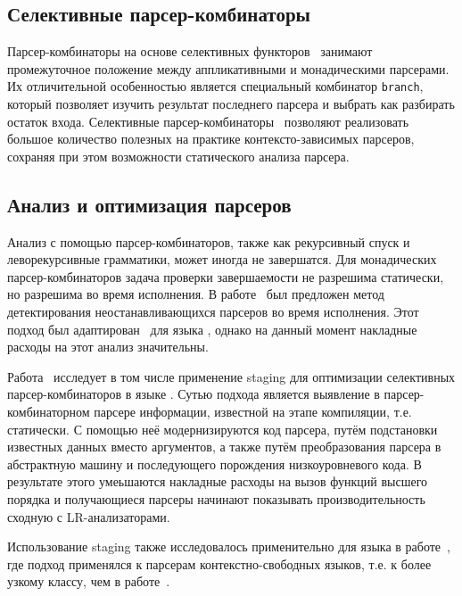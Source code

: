 \subsection{Селективные парсер-комбинаторы}

Парсер-комбинаторы на основе селективных функторов~\cite{selective} занимают промежуточное положение между аппликативными и монадическими парсерами. Их отличительной особенностью является специальный комбинатор 
\verb=branch=, который позволяет изучить результат последнего парсера и выбрать как разбирать остаток входа. Селективные парсер-ком\-бинаторы~\cite{parsley2020} позволяют реализовать большое количество полезных на практике контексто-зависимых парсеров, сохраняя при этом возможности статического анализа парсера.


\subsection{Анализ и оптимизация парсеров}

Анализ с помощью парсер-комбинаторов, также как рекурсивный спуск и леворекурсивные грамматики, может иногда не завершатся. Для монадических парсер-комбинаторов задача проверки завершаемости не разрешима статически, но разрешима во время исполнения. В работе~\cite{meerkat} был предложен метод детектирования неостанавливающихся парсеров во время исполнения. Этот подход был адаптирован~\cite{borovkov} для языка \OCaml{}, однако на данный момент накладные расходы на этот анализ значительны.

Работа~\cite{parsley2020} исследует в том числе применение staging для оптимизации селективных парсер-комбинаторов в языке \Haskell{}. Сутью подхода является выявление в парсер-комбинаторном парсере информации, известной на этапе компиляции, т.е. статически. С помощью неё модернизируются код парсера, путём подстановки известных данных вместо аргументов, а также путём преобразования парсера в абстрактную машину и последующего порождения низкоуровневого кода. В результате этого умеьшаются накладные расходы на вызов функций высшего порядка и получающиеся парсеры начинают показывать производительность сходную с LR-анализаторами.

Использование staging также исследовалось применительно для языка \OCaml{} в работе~\cite{yallop2019}, где подход применялся к парсерам контекстно-свободных языков, т.е. к более узкому классу, чем в работе~\cite{parsley2020}.



